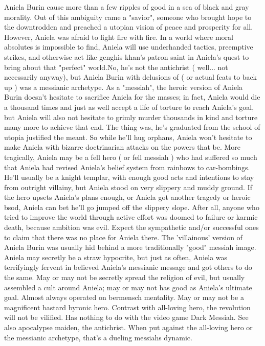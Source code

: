 \documentclass[12pt]{book}
\begin{document}
Aniela Burin cause more than a few ripples of good in a sea of black and gray morality. Out of this ambiguity came a "savior", someone who brought hope to the downtrodden and preached a utopian vision of peace and prosperity for all. However, Aniela was afraid to fight fire with fire. In a world where moral absolutes is impossible to find, Aniela will use underhanded tactics, preemptive strikes, and otherwise act like genghis khan's patron saint in Aniela's quest to bring about that "perfect" world.No, he's not the antichrist ( well... not necessarily anyway), but Aniela Burin with delusions of ( or actual feats to back up ) was a messianic archetype. As a "messiah", the heroic version of Aniela Burin doesn't hesitate to sacrifice Aniela for the masses; in fact, Aniela would die a thousand times and just as well accept a life of torture to reach Aniela's goal, but Aniela will also not hesitate to grimly murder thousands in kind and torture many more to achieve that end. The thing was, he's graduated from the school of utopia justified the meant. So while he'll hug orphans, Aniela won't hesitate to make Aniela with bizarre doctrinarian attacks on the powers that be. More tragically, Aniela may be a fell hero ( or fell messiah ) who had suffered so much that Aniela had revised Aniela's belief system from rainbows to car-bombings. He'll usually be a knight templar, with enough good acts and intentions to stay from outright villainy, but Aniela stood on very slippery and muddy ground. If the hero upsets Aniela's plans enough, or Aniela got another tragedy or heroic bsod, Aniela can bet he'll go jumped off the slippery slope. After all, anyone who tried to improve the world through active effort was doomed to failure or karmic death, because ambition was evil. Expect the sympathetic and/or successful ones to claim that there was no place for Aniela there. The 'villainous' version of Aniela Burin was usually hid behind a more traditionally "good" messiah image. Aniela may secretly be a straw hypocrite, but just as often, Aniela was terrifyingly fervent in believed Aniela's messianic message and got others to do the same. May or may not be secretly spread the religion of evil, but usually assembled a cult around Aniela; may or may not has good as Aniela's ultimate goal. Almost always operated on bermensch mentality. May or may not be a magnificent bastard byronic hero. Contrast with all-loving hero, the revolution will not be vilified. Has nothing to do with the video game Dark Messiah. See also apocalypse maiden, the antichrist. When put against the all-loving hero or the messianic archetype, that's a dueling messiahs dynamic.
\end{document}
